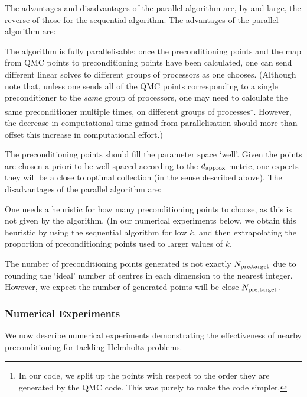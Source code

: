     The advantages and disadvantages of the parallel algorithm are, by and large, the reverse of those for the sequential algorithm. The advantages of the parallel algorithm are:
    \bit
  \item The algorithm is fully parallelisable; once the preconditioning points and the map from QMC points to preconditioning points have been calculated, one can send different linear solves to different groups of processors as one chooses. (Although note that, unless one sends all of the QMC points corresponding to a single preconditioner to the \emph{same} group of processors, one may need to calculate the same preconditioner multiple times, on different groups of processes\footnote{In our code, we split up the points with respect to the order they are generated by the QMC code. This was purely to make the code simpler.}. However, the decrease in computational time gained from parallelisation should more than offset this increase in computational effort.)
    \item The preconditioning points should fill the parameter space `well'. Given the points are chosen a priori to be well spaced according to the $d_{\mathrm{approx}}$ metric, one expects they will be a close to optimal collection (in the sense described above).
      \eit
      The disadvantages of the parallel algorithm are:
      \bit
    \item One needs a heuristic for how many preconditioning points to choose, as this is not given by the algorithm. (In our numerical experiments below, we obtain this heuristic by using the sequential algorithm for low $k$, and then extrapolating the proportion of preconditioning points used to larger values of $k.$
      \item The number of preconditioning points generated is not exactly $N_{\mathrm{pre,target}}$ due to rounding the `ideal' number of centres in each dimension to the nearest integer. However, we expect the number of generated points will be close $N_{\mathrm{pre,target}}$.
      \eit
{}

\subsubsection{Numerical Experiments}\label{sec:nbpcqmcnumerics}

We now describe numerical experiments demonstrating the effectiveness of nearby preconditioning for tackling Helmholtz problems.

